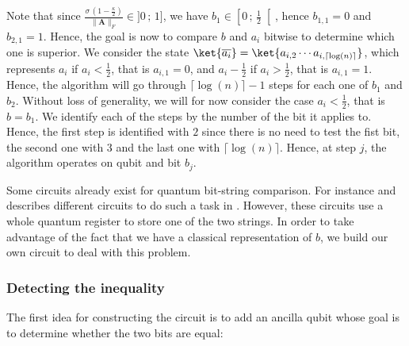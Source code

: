 \documentclass[11pt, a4paper]{article}
\begin{document}
                Note that since \(\frac{\sigma\,\left(1 - \frac\kappa2\right)}{\|\mathbf{A}\|_F}\in]0\,;\,1]\), we have \(b_1\in\left[0\,;\,\frac12\right[\), hence \(b_{1,1}=0\) and \(b_{2,1}=1\). Hence, the goal is now to compare \(b\) and \(a_i\) bitwise to determine which one is superior. We consider the state \(\ket{\overline{a_i}} = \ket{a_{i,2}\cdots a_{i,\lceil\log(n)\rceil}}\), which represents \(a_i\) if \(a_i<\frac12\), that is \(a_{i,1}=0\), and \(a_i-\frac12\) if \(a_i>\frac12\), that is \(a_{i, 1} = 1\). Hence, the algorithm will go through \(\lceil\log(n)\rceil - 1\) steps for each one of \(b_1\) and \(b_2\). Without loss of generality, we will for now consider the case \(a_i<\frac12\), that is \(b=b_1\). We identify each of the steps by the number of the bit it applies to. Hence, the first step is identified with \(2\) since there is no need to test the fist bit, the second one with \(3\) and the last one with \(\lceil\log(n)\rceil\). Hence, at step \(j\), the algorithm operates on qubit  and bit \(b_j\).
                
                Some circuits already exist for quantum bit-string comparison. For instance \citeauthor{QBSC} and describes different circuits to do such a task in \cite{QBSC}. However, these circuits use a whole quantum register to store one of the two strings. In order to take advantage of the fact that we have a classical representation of \(b\), we build our own circuit to deal with this problem.
                
            \subsubsection{Detecting the inequality}
                The first idea for constructing the circuit is to add an ancilla qubit whose goal is to determine whether the two bits are equal:
                
\end{document}
